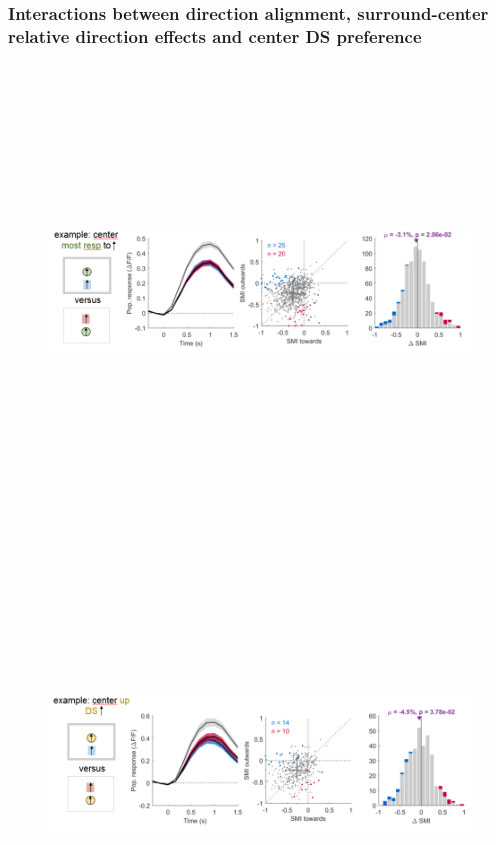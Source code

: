 \subsubsection{Interactions between direction alignment, surround-center relative direction effects and center DS preference}

\begin{figure}[H] \centering \includegraphics[width=12cm,height=12cm,keepaspectratio]{Figures/7.Results/finalPopulation/sel/diagrams/19.png} 
\end{figure}

\begin{figure}[H] \centering \includegraphics[width=12cm,height=12cm,keepaspectratio]{Figures/7.Results/finalPopulation/sel/diagrams/20.png} 
\end{figure}

